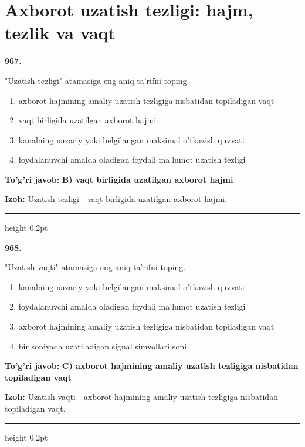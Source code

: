 \documentclass[10pt,a4paper,oneside]{article}
\begin{document}
\section{Axborot uzatish tezligi: hajm, tezlik va vaqt}

\noindent\textbf{\color{ink}967.}
\par
"Uzatish tezligi" atamasiga eng aniq ta'rifni toping.
\begin{enumerate}[label=\Alph*),leftmargin=9mm]
\item axborot hajmining amaliy uzatish tezligiga nisbatidan topiladigan vaqt
\item vaqt birligida uzatilgan axborot hajmi
\item kanalning nazariy yoki belgilangan maksimal o'tkazish quvvati
\item foydalanuvchi amalda oladigan foydali ma'lumot uzatish tezligi
\end{enumerate}
\begin{tcolorbox}[enhanced,breakable,colback=teal!4,colframe=teal!50!black,boxrule=0.5pt,arc=1.1mm,left=3mm,right=3mm,top=1.7mm,bottom=1.7mm,before skip=2mm,after skip=2mm]
\textbf{\color{teal}To'g'ri javob:} \textbf{B) vaqt birligida uzatilgan axborot hajmi}
\par\smallskip
\textbf{Izoh:} Uzatish tezligi - vaqt birligida uzatilgan axborot hajmi.
\end{tcolorbox}
\vspace{2mm}\hrule height 0.2pt \vspace{3mm}

\noindent\textbf{\color{ink}968.}
\par
"Uzatish vaqti" atamasiga eng aniq ta'rifni toping.
\begin{enumerate}[label=\Alph*),leftmargin=9mm]
\item kanalning nazariy yoki belgilangan maksimal o'tkazish quvvati
\item foydalanuvchi amalda oladigan foydali ma'lumot uzatish tezligi
\item axborot hajmining amaliy uzatish tezligiga nisbatidan topiladigan vaqt
\item bir soniyada uzatiladigan signal simvollari soni
\end{enumerate}
\begin{tcolorbox}[enhanced,breakable,colback=teal!4,colframe=teal!50!black,boxrule=0.5pt,arc=1.1mm,left=3mm,right=3mm,top=1.7mm,bottom=1.7mm,before skip=2mm,after skip=2mm]
\textbf{\color{teal}To'g'ri javob:} \textbf{C) axborot hajmining amaliy uzatish tezligiga nisbatidan topiladigan vaqt}
\par\smallskip
\textbf{Izoh:} Uzatish vaqti - axborot hajmining amaliy uzatish tezligiga nisbatidan topiladigan vaqt.
\end{tcolorbox}
\vspace{2mm}\hrule height 0.2pt \vspace{3mm}
\end{document}
